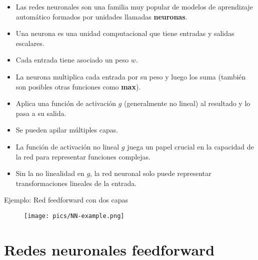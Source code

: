 



\begin{itemize}
\item Las redes neuronales son una familia muy popular de modelos de aprendizaje automático formados por unidades llamadas \textbf{neuronas}.
\item Una neurona es una unidad computacional que tiene entradas y salidas escalares.
\item Cada entrada tiene asociado un peso $w$.
\item La neurona multiplica cada entrada por su peso y luego los suma (también son posibles otras funciones como \textbf{max}).
\item Aplica una función de activación $g$ (generalmente no lineal) al resultado y lo pasa a su salida.
\item Se pueden apilar múltiples capas.
\item La función de activación no lineal $g$ juega un papel crucial en la capacidad de la red para representar funciones complejas.
\item Sin la no linealidad en $g$, la red neuronal solo puede representar transformaciones lineales de la entrada.
\end{itemize}

Ejemplo: Red feedforward con dos capas

\begin{figure}[htb]
	\centering
	 \texttt{[image: pics/NN-example.png]}
\end{figure}


\section{Redes neuronales feedforward}


